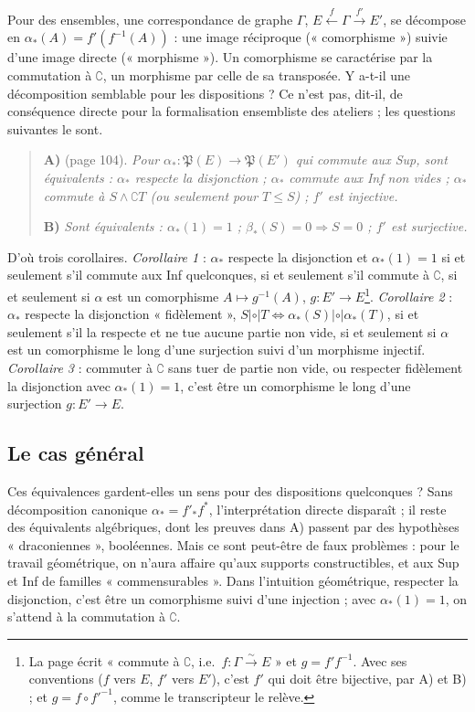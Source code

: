 \documentclass[11pt,a4paper]{article}
\begin{document}
Pour des ensembles, une correspondance de graphe $\Gamma$, $E \xleftarrow{f}
\Gamma \xrightarrow{f'} E'$, se décompose en $\alpha_{*}(A) = f'(f^{-1}(A))$ : une
image réciproque (« comorphisme ») suivie d'une image directe (« morphisme »). Un
comorphisme se caractérise par la commutation à $\complement$, un morphisme par
celle de sa transposée. Y a-t-il une décomposition semblable pour les
dispositions ? Ce n'est pas, dit-il, de conséquence directe pour la
formalisation ensembliste des ateliers ; les questions suivantes le sont.

\begin{quote}
\textbf{A)} (page 104). \emph{Pour $\alpha_{*} : \mathfrak{P}(E) \to
\mathfrak{P}(E')$ qui commute aux Sup, sont équivalents : $\alpha_{*}$ respecte
la disjonction ; $\alpha_{*}$ commute aux Inf non vides ; $\alpha_{*}$ commute à
$S \wedge \complement T$ (ou seulement pour $T \leq S$) ; $f'$ est injective.}

\textbf{B)} \emph{Sont équivalents : $\alpha_{*}(1) = 1$ ; $\beta_{*}(S) = 0
\Rightarrow S = 0$ ; $f'$ est surjective.}
\end{quote}

D'où trois corollaires. \emph{Corollaire 1} : $\alpha_{*}$ respecte la
disjonction et $\alpha_{*}(1) = 1$ si et seulement s'il commute aux Inf
quelconques, si et seulement s'il commute à $\complement$, si et seulement si
$\alpha$ est un comorphisme $A \mapsto g^{-1}(A)$, $g : E' \to E$\footnote{La page
écrit « commute à $\complement$, i.e.\ $f : \Gamma \xrightarrow{\sim} E$ » et $g =
f' f^{-1}$. Avec ses conventions ($f$ vers $E$, $f'$ vers $E'$), c'est $f'$ qui
doit être bijective, par A) et B) ; et $g = f \circ f'^{-1}$, comme le
transcripteur le relève.}. \emph{Corollaire 2} : $\alpha_{*}$ respecte la
disjonction « fidèlement », $S \mathrel{|\circ|} T \iff \alpha_{*}(S)
\mathrel{|\circ|} \alpha_{*}(T)$, si et seulement s'il la respecte et ne tue
aucune partie non vide, si et seulement si $\alpha$ est un comorphisme le long
d'une surjection suivi d'un morphisme injectif. \emph{Corollaire 3} : commuter à
$\complement$ sans tuer de partie non vide, ou respecter fidèlement la
disjonction avec $\alpha_{*}(1) = 1$, c'est être un comorphisme le long d'une
surjection $g : E' \to E$.

\subsection*{Le cas général}

Ces équivalences gardent-elles un sens pour des dispositions quelconques ? Sans
décomposition canonique $\alpha_{*} = f'_{*}f^{*}$, l'interprétation directe
disparaît ; il reste des équivalents algébriques, dont les preuves dans A)
passent par des hypothèses « draconiennes », booléennes. Mais ce sont peut-être
de faux problèmes : pour le travail géométrique, on n'aura affaire qu'aux
supports constructibles, et aux Sup et Inf de familles « commensurables ». Dans
l'intuition géométrique, respecter la disjonction, c'est être un comorphisme
suivi d'une injection ; avec $\alpha_{*}(1) = 1$, on s'attend à la commutation à
$\complement$.
\end{document}

